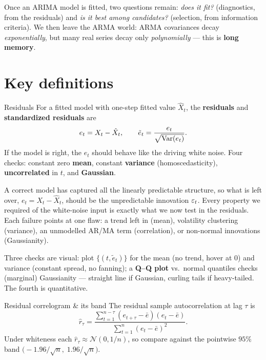 \documentclass[11pt]{article}
\begin{document}

Once an ARIMA model is fitted, two questions remain: \emph{does it fit?} (diagnostics, from the residuals) and \emph{is it best among candidates?} (selection, from information criteria). We then leave the ARMA world: ARMA covariances decay \emph{exponentially}, but many real series decay only \emph{polynomially} --- this is \textbf{long memory}.

\section*{Key definitions}

\begin{defn}{Residuals}
For a fitted model with one-step fitted value $\hat X_t$, the \textbf{residuals} and \textbf{standardized residuals} are
\[
e_t = X_t - \hat X_t,
\qquad
\tilde e_t = \frac{e_t}{\sqrt{\operatorname{Var}(e_t)}}.
\]
If the model is right, the $e_t$ should behave like the driving white noise. Four checks: constant zero \textbf{mean}, constant \textbf{variance} (homoscedasticity), \textbf{uncorrelated} in $t$, and \textbf{Gaussian}.
\end{defn}

\begin{intu}
A correct model has captured all the linearly predictable structure, so what is left over, $e_t=X_t-\hat X_t$, should be the unpredictable innovation $\varepsilon_t$. Every property we required of the white-noise input is exactly what we now test in the residuals. Each failure points at one flaw: a trend left in (mean), volatility clustering (variance), an unmodelled AR/MA term (correlation), or non-normal innovations (Gaussianity).
\end{intu}

Three checks are visual: plot $\{(t,\tilde e_t)\}$ for the mean (no trend, hover at $0$) and variance (constant spread, no fanning); a \textbf{Q--Q plot} vs.\ normal quantiles checks (marginal) Gaussianity --- straight line if Gaussian, curling tails if heavy-tailed. The fourth is quantitative.

\begin{defn}{Residual correlogram \& its band}
The residual sample autocorrelation at lag $\tau$ is
\[
\hat r_\tau
= \frac{\sum_{t=1}^{n-\tau}(e_{t+\tau}-\bar e)(e_t-\bar e)}
       {\sum_{t=1}^{n}(e_t-\bar e)^2}.
\]
Under whiteness each $\hat r_\tau \approx \mathcal N(0,1/n)$, so compare against the pointwise $95\%$ band $\bigl(-1.96/\sqrt n,\; 1.96/\sqrt n\bigr)$.
\end{defn}
\end{document}
